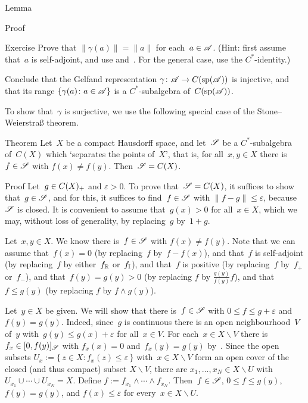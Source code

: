 \documentclass[a]{subfiles}
\begin{document}
\begin{parsec}
\begin{point}{Lemma}
\begin{point}{Proof}
\end{point}
\end{point}
\begin{point}{Exercise}%
Prove that $\|\gamma(a)\|=\|a\|$
for each~$a\in\mathscr{A}$.
(Hint: first assume that~$a$ is self-adjoint,
and use  and~.
For the general case,
use the $C^*$-identity.)

Conclude that the Gelfand representation $\gamma\colon \mathscr{A}\to C(\mathrm{sp}(\mathscr{A}))$
is injective,
and that its range $\{\gamma(a)\colon a\in\mathscr{A}\}$
is a $C^*$-subalgebra of~$C(\mathrm{sp}(\mathscr{A}))$.
\end{point}
\begin{point}%
To show that~$\gamma$ is surjective,
we use the following special case of
the Stone--Weierstra\ss{} theorem. 
\end{point}
\begin{point}{Theorem}%
Let~$X$ be a compact Hausdorff space,
and let~$\mathscr{S}$ be a $C^*$-subalgebra of~$C(X)$
which `separates the points of~$X$',
that is, for all~$x,y\in X$
there is~$f\in \mathscr{S}$ with $f(x)\neq f(y)$.
Then~$\mathscr{S}=C(X)$.
\begin{point}{Proof}%
Let~$g\in C(X)_{+}$ and $\varepsilon >0$.
To prove that~$\mathscr{S}=C(X)$,
it suffices to show that~$g\in \mathscr{S}$,
and for this,
it suffices to find~$f\in \mathscr{S}$ with $\|f-g\|\leq \varepsilon$,
because~$\mathscr{S}$ is closed.
It is convenient to assume that~$g(x)> 0$ for all~$x\in X$,
which we may, without loss of generality,
by replacing~$g$ by~$1+g$.

\begin{point}%
Let~$x,y\in X$.
We know there is~$f\in \mathscr{S}$ with $f(x)\neq f(y)$.
Note that we can assume that~$f(x)=0$ (by replacing~$f$ by~$f-f(x)$),
and that~$f$ is self-adjoint (by replacing~$f$
by either~$f_{\mathbb{R}}$ or~$f_{\mathbb{I}}$),
and that~$f$ is positive
(by replacing~$f$ by~$f_+$ or~$f_-$),
and that~$f(y)=g(y)>0$
(by replacing $f$ by $\frac{g(y)}{f(y)} f$),
and that~$f\leq g(y)$
(by replacing $f$ by $f\wedge g(y)$).
\end{point}
\begin{point}%
Let~$y\in X$ be given.
We will show that there is~$f\in\mathscr{S}$
with $0\leq f\leq g+\varepsilon$
and~$f(y)=g(y)$.
Indeed,
since~$g$ is continuous
there is an open neighbourhood~$V$ of~$y$
with~$g(y) \leq  g(x)+\varepsilon$
for all~$x\in V$.
For each~$x\in X\backslash V$ there is $f_x \in [0,f(y)]_{\mathscr{S}}$
with $f_x(x)=0$ and~$f_x(y)=g(y)$ by~.
Since the open subsets
$U_x := \{\,z\in X\colon f_x(z)\leq \varepsilon\,\}$
with~$x\in X\backslash V$
form an open cover of the closed (and thus compact) subset $X\backslash V$,
there are $x_1,\dotsc,x_N\in X\backslash U$
with $U_{x_1}\cup\dotsb\cup U_{x_N}=X$.
Define $f:=f_{x_1}\wedge \dotsb \wedge f_{x_N}$.
Then~$f\in \mathscr{S}$, $0\leq f\leq g(y)$, $f(y)=g(y)$,
and $f(x)\leq \varepsilon$
for every~$x\in X\backslash U$.


\end{point}
\end{point}
\end{point}
\end{parsec}
\end{document}
